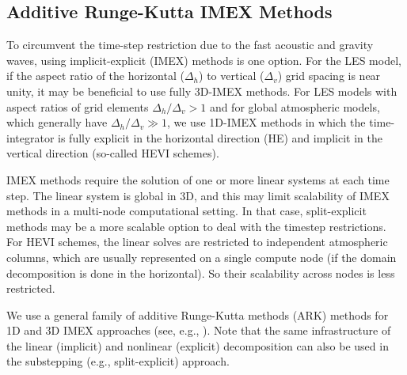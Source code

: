\documentclass{report}
\begin{document}
\subsection{Additive Runge-Kutta IMEX Methods}

To circumvent the time-step restriction due to the fast acoustic and gravity waves, using implicit-explicit (IMEX) methods is one option. For the LES model, if the aspect ratio of the horizontal ($\Delta_h$) to vertical ($\Delta_v$) grid spacing is near unity, it may be beneficial to use fully 3D-IMEX methods.  For LES models with aspect ratios of grid elements $\Delta_h/\Delta_v > 1$ and for global atmospheric models, which generally have $\Delta_h/\Delta_v \gg 1$, we use 1D-IMEX methods in which the time-integrator is fully explicit in the horizontal direction (HE) and implicit in the vertical direction (so-called HEVI schemes). 

IMEX methods require the solution of one or more linear systems at each time step. The linear system is global in 3D, and this may limit scalability of IMEX methods in a multi-node computational setting. In that case, split-explicit methods may be a more scalable option to deal with the timestep restrictions. For HEVI schemes, the linear solves are restricted to independent atmospheric columns, which are usually represented on a single compute node (if the domain decomposition is done in the horizontal). So their scalability across nodes is less restricted.

We use a general family of additive Runge-Kutta methods (ARK) methods for 1D and 3D IMEX approaches (see, e.g., \citet{giraldo:2013}). Note that the same infrastructure of the linear (implicit) and nonlinear (explicit) decomposition can also be used in the substepping (e.g., split-explicit) approach.
\end{document}
